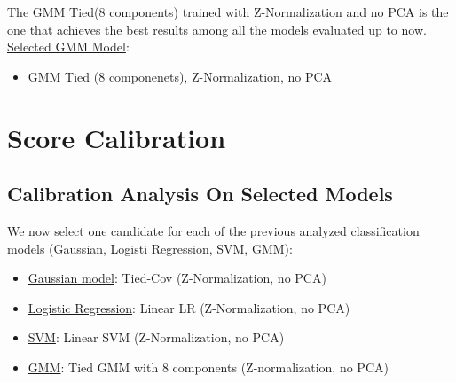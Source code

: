 \documentclass[10pt, a4paper, twocolumn]{article} %
\begin{document}
The GMM Tied(8 components) trained with Z-Normalization and no PCA is the one that achieves
the best results among all the models evaluated up to now.\\
\underline{Selected GMM Model}:
\begin{itemize}
	\item GMM Tied (8 componenets), Z-Normalization, no PCA
\end{itemize}
\section{Score Calibration}
\subsection{Calibration Analysis On Selected Models}
We now select one candidate for each of the previous analyzed classification models (Gaussian, Logisti Regression,
SVM, GMM):
\begin{itemize}
	\item \underline{Gaussian model}: Tied-Cov (Z-Normalization, no PCA)
	\item \underline{Logistic Regression}: Linear LR (Z-Normalization, no PCA)
	\item \underline{SVM}: Linear SVM (Z-Normalization, no PCA)
	\item \underline{GMM}: Tied GMM with 8 components (Z-normalization, no PCA)
\end{itemize}
\end{document}
